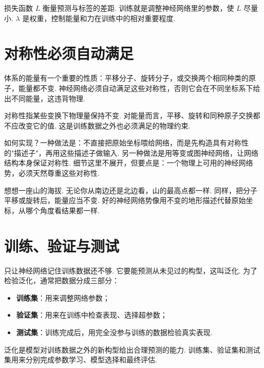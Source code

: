 \documentclass[UTF8,11pt,a4paper,openany]{ctexbook}
\begin{document}
\begin{notationbox}
损失函数 $L$ 衡量预测与标签的差距. 训练就是调整神经网络里的参数，使 $L$ 尽量小. $\lambda$ 是权重，控制能量和力在训练中的相对重要程度. 
\end{notationbox}

\section{对称性必须自动满足}

体系的能量有一个重要的性质：平移分子、旋转分子，或交换两个相同种类的原子，能量都不变. 神经网络必须自动满足这些对称性，否则它会在不同坐标系下给出不同能量，这违背物理. 

\begin{notationbox}
对称性指某些变换下物理量保持不变. 对能量而言，平移、旋转和同种原子交换都不应改变它的值. 这是训练数据之外也必须满足的物理约束. 
\end{notationbox}

如何实现？一种做法是：不直接把原始坐标喂给网络，而是先构造具有对称性的"描述子"，再用这些描述子做输入. 另一种做法是用等变或图神经网络，让网络结构本身保证对称性. 细节这里不展开，但要点是：一个物理上可用的神经网络势，必须天然尊重这些对称性. 

\begin{analogybox}
想想一座山的海拔. 无论你从南边还是北边看，山的最高点都一样. 同样，把分子平移或旋转后，能量应当不变. 好的神经网络势像用不变的地形描述代替原始坐标，从哪个角度看结果都一样. 
\end{analogybox}

\section{训练、验证与测试}

只让神经网络记住训练数据还不够. 它要能预测从未见过的构型，这叫泛化. 为了检验泛化，通常把数据分成三部分：
\begin{itemize}
\item \textbf{训练集}：用来调整网络参数；
\item \textbf{验证集}：用来在训练中检查表现、选择超参数；
\item \textbf{测试集}：训练完成后，用完全没参与训练的数据检验真实表现. 
\end{itemize}

\begin{definitionbox}
泛化是模型对训练数据之外的新构型给出合理预测的能力. 训练集、验证集和测试集用来分别完成参数学习、模型选择和最终评估. 
\end{definitionbox}
\end{document}
